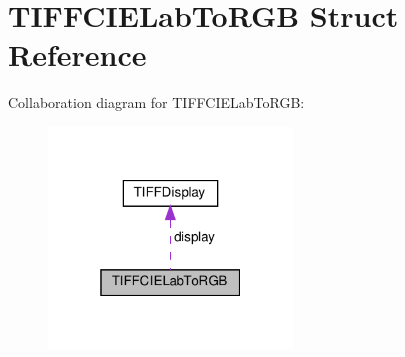 \hypertarget{structTIFFCIELabToRGB}{}\section{T\+I\+F\+F\+C\+I\+E\+Lab\+To\+R\+GB Struct Reference}
\label{structTIFFCIELabToRGB}


Collaboration diagram for T\+I\+F\+F\+C\+I\+E\+Lab\+To\+R\+GB\+:
\nopagebreak
\begin{figure}[H]
\begin{center}
\leavevmode
\includegraphics[width=184pt]{structTIFFCIELabToRGB__coll__graph}
\end{center}
\end{figure}
